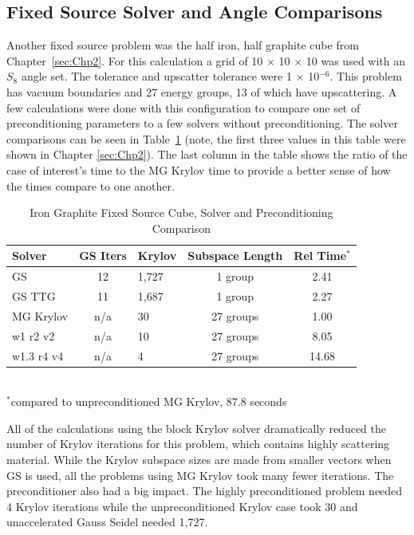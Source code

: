 \subsection{Fixed Source Solver and Angle Comparisons} 
Another fixed source problem was the half iron, half graphite cube from Chapter~\ref{sec:Chp2}. For this calculation a grid of 10 $\times$ 10 $\times$ 10 was used with an $S_{8}$ angle set. The tolerance and upscatter tolerance were 1 $\times$ 10$^{-6}$. This problem has vacuum boundaries and 27 energy groups, 13 of which have upscattering. A few calculations were done with this configuration to compare one set of preconditioning parameters to a few solvers without preconditioning. The solver comparisons can be seen in Table~\ref{table:FeC solvers} (note, the first three values in this table were shown in Chapter \ref{sec:Chp2}). The last column in the table shows the ratio of the case of interest's time to the MG Krylov time to provide a better sense of how the times compare to one another.
%
\begin{table}[!h]
\caption{Iron Graphite Fixed Source Cube, Solver and Preconditioning Comparison}
\begin{center}
\begin{tabular}{| l | c | l | c | c |}
\hline
Solver & GS Iters & Krylov & Subspace Length & Rel Time$^{*}$\\[0.5ex]
\hline
GS &  12 & 1,727 & 1 group & 2.41 \\ %
GS TTG & 11 & 1,687 & 1 group & 2.27 \\ %
MG Krylov & n/a & 30 & 27 groups & 1.00 \\ %
w1 r2 v2 & n/a & 10 & 27 groups & 8.05 \\ %
w1.3 r4 v4 & n/a & 4 & 27 groups & 14.68 \\ %
\hline
\end{tabular}\\
$^{*}$compared to unpreconditioned MG Krylov, 87.8 seconds
\end{center}
\label{table:FeC solvers}
\end{table}

All of the calculations using the block Krylov solver dramatically reduced the number of Krylov iterations for this problem, which contains highly scattering material. While the Krylov subspace sizes are made from smaller vectors when GS is used, all the problems using MG Krylov took many fewer iterations. The preconditioner also had a big impact. The highly preconditioned problem needed 4 Krylov iterations while the unpreconditioned Krylov case took 30 and unaccelerated Gauss Seidel needed 1,727.  

